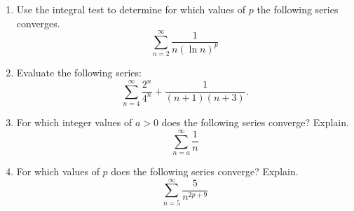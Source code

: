 \documentclass[12pt]{article}
\begin{document}
\begin{enumerate}
\begin{enumerate}
\vspace{2.5in}
\item $\displaystyle\sum_{n=2}^{\infty} \frac{n}{n^2+1}$

\vspace{2.5in}
\item $\displaystyle\sum_{n=3}^{\infty} \ln(n)$


\end{enumerate} 
\newpage
\item Use the integral test to determine for which values of $p$ the following series converges.
\[
\sum_{n = 2}^\infty \frac{1}{n (\ln n)^p}
\]
\vfill
\item Evaluate the following series:
\[
\displaystyle \sum_{n = 4}^\infty \frac{2^n}{4^n} + \frac{1}{(n + 1)(n + 3)}.
\]
\vfill

\newpage

\item For which integer values of $a > 0$ does the following series converge?  Explain.
\[
\sum_{n = a}^\infty \frac{1}{n}
\]
\vfill
\item For which values of $p$ does the following series converge?  Explain.
\[
\sum_{n = 5}^\infty \frac{5}{n^{2p + 9}}
\]
\vfill
\end{enumerate}
%
%
%
\end{document}
